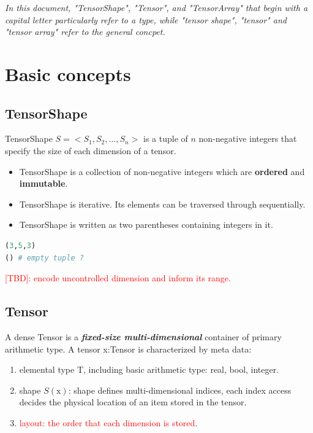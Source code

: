 \textit{In this document, "TensorShape", "Tensor", and "TensorArray" that begin with a capital letter particularly refer to a type, while "tensor shape", "tensor" and "tensor array" refer to the general concpet.}

\section{Basic concepts}

\subsection{TensorShape}

TensorShape $S=<S_1,S_2,...,S_n>$ is a tuple of $n$ non-negative integers that specify the size of each dimension of a tensor.

\begin{itemize}
  \item TensorShape is a collection of non-negative integers which are \textbf{ordered} and \textbf{immutable}.
  \item TensorShape is iterative. Its elements can be traversed through sequentially.
  \item TensorShape is written as two parentheses containing integers in it.
\end{itemize}

\begin{lstlisting}[language=Python]
(3,5,3)
() # empty tuple ?
\end{lstlisting}

\textcolor{red}{[TBD]: encode uncontrolled dimension and inform its range.}

\subsection{Tensor}

A dense Tensor is a \textbf{\textit{fixed-size multi-dimensional}} container of primary arithmetic type. A tensor x:Tensor is characterized by meta data:
\begin{enumerate}
  \item elemental type T, including basic arithmetic type: real, bool, integer.
  \item shape $S(\text{x})$: shape defines multi-dimensional indices, each index access decides the physical location of an item stored in the tensor.
  \item \textcolor{red}{layout: the order that each dimension is stored}.
\end{enumerate}

